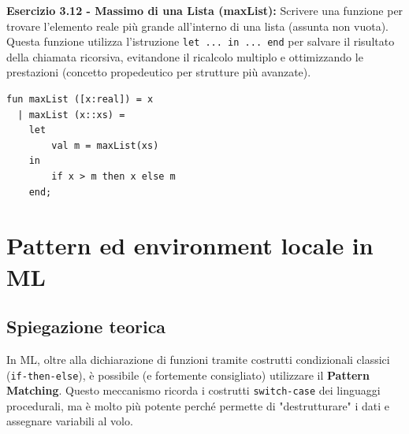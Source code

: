 \documentclass[12pt, a4paper]{article}
\begin{document}
\newpage

\textbf{Esercizio 3.12 - Massimo di una Lista (maxList):}
Scrivere una funzione per trovare l'elemento reale più grande all'interno di una lista (assunta non vuota). 
Questa funzione utilizza l'istruzione \texttt{let ... in ... end} per salvare il risultato della chiamata ricorsiva, evitandone il ricalcolo multiplo e ottimizzando le prestazioni (concetto propedeutico per strutture più avanzate).
\begin{verbatim}
fun maxList ([x:real]) = x
  | maxList (x::xs) =
    let 
        val m = maxList(xs)
    in 
        if x > m then x else m
    end;
\end{verbatim}

\section{Pattern ed environment locale in ML}

\subsection{Spiegazione teorica}
In ML, oltre alla dichiarazione di funzioni tramite costrutti condizionali classici \\(\texttt{if-then-else}), è possibile (e fortemente consigliato) utilizzare il \textbf{Pattern Matching}. Questo meccanismo ricorda i costrutti \texttt{switch-case} dei linguaggi procedurali, ma è molto più potente perché permette di "destrutturare" i dati e assegnare variabili al volo.
\end{document}
